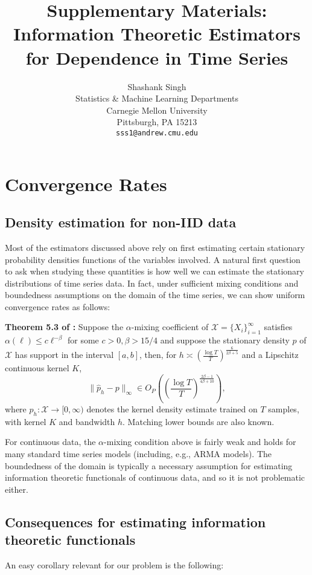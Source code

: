 \documentclass{article} %
\title{Supplementary Materials:
Information Theoretic Estimators for Dependence in Time Series}
\author{
Shashank Singh \\
Statistics \& Machine Learning Departments \\
Carnegie Mellon University \\
Pittsburgh, PA 15213 \\
\texttt{sss1@andrew.cmu.edu}
}
\newcommand{\X}{\mathcal{X}}                        %
\renewcommand{\hat}{\widehat}
\begin{document}
\maketitle

\section{Convergence Rates}
\label{sec:theory}
\subsection{Density estimation for non-IID data}
Most of the estimators discussed above rely on first estimating certain
stationary probability densities functions of the variables involved. A natural
first question to ask when studying these quantities is how well we can
estimate the stationary distributions of time series data. In fact, under
sufficient mixing conditions and boundedness assumptions on the domain of the
time series, we can show uniform convergence rates as follows:

{\bf Theorem 5.3 of \citet{fan03timeSeries}:} Suppose the
$\alpha$-mixing coefficient of $\X = \{X_i\}_{i = 1}^\infty$ satisfies
$\alpha(\ell) \leq c\ell^{-\beta}$ for some $c > 0, \beta > 15/4$ and suppose
the stationary density $p$ of $\X$ has support in the interval $[a,b]$, then,
for $h \asymp \left( \frac{\log T}{T} \right)^{\frac{6}{2\beta + 5}}$ and a
Lipschitz continuous kernel $K$,
\[\|\hat p_h - p\|_\infty
    \in O_P\left( \left( \frac{\log T}{T} \right)^{\frac{2\beta - 1}{4\beta + 10}} \right),\]
where $\hat p_h : \mathscr{X} \to [0,\infty)$ denotes the kernel density
estimate trained on $T$ samples, with kernel $K$ and bandwidth $h$. Matching
lower bounds are also known.

For continuous data, the $\alpha$-mixing condition above is fairly weak and
holds for many standard time series models (including, e.g., ARMA models). The
boundedness of the domain is typically a necessary assumption for estimating
information theoretic functionals of continuous data, and so it is not
problematic either.

\subsection{Consequences for estimating information theoretic functionals}

An easy corollary relevant for our problem is the following:
\end{document}
